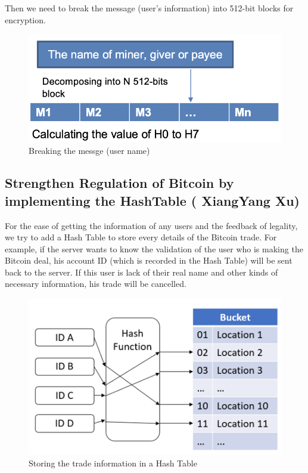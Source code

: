 \documentclass[conference]{IEEEtran}
\begin{document}
Then we need to break the message (user’s information) into 512-bit blocks for encryption.

\begin{figure}[ht]
	\centering
	\includegraphics[scale=0.3]{fig2.png}
	\caption{Breaking the messge (user name)}
	\label{fig:label}
\end{figure}

\subsection{Strengthen Regulation of Bitcoin by implementing the HashTable ( XiangYang Xu)}

For the ease of getting the information of any users and the feedback of legality, we try to add a Hash Table to store every details of the Bitcoin trade. For example, if the server wants to know the validation of the user who is making the Bitcoin deal, his account ID (which is recorded in the Hash Table) will be sent back to the server. If this user is lack of their real name and other kinds of necessary information, his trade will be cancelled.

\begin{figure}[ht]
	\centering
	\includegraphics[scale=0.4]{fig3.png}
	\caption{Storing the trade information in a Hash Table}
	\label{fig:label}
\end{figure}
\end{document}
